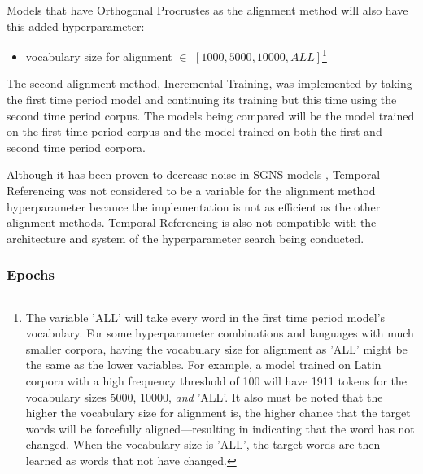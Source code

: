 Models that have Orthogonal Procrustes as the alignment method will also have this added hyperparameter:
\begin{itemize}
    \item vocabulary size for alignment $\in$ $[1000, 5000, 10000, ALL]$\footnote{The variable 'ALL' will take every word in the first time period model's vocabulary. For some hyperparameter combinations and languages with much smaller corpora, having the vocabulary size for alignment as 'ALL' might be the same as the lower variables. For example, a model trained on Latin corpora with a high frequency threshold of 100 will have 1911 tokens for the vocabulary sizes 5000, 10000, \emph{and} 'ALL'. It also must be noted that the higher the vocabulary size for alignment is, the higher chance that the target words will be forcefully aligned—resulting in indicating that the word has not changed. When the vocabulary size is 'ALL', the target words are then learned as words that not have changed.} 
\end{itemize}%


The second alignment method,  Incremental Training, was implemented by taking the first time period model and continuing its training but this time using the second time period corpus. The models being compared will be the model trained on the first time period corpus and the model trained on both the first and second time period corpora.

Although it has been proven to decrease noise in SGNS models \citep{dubossarsky-etal-2019-time}, Temporal Referencing was not considered to be a variable for the alignment method hyperparameter becauce the implementation is not as efficient as the other alignment methods. Temporal Referencing is also not compatible with the architecture and system of the hyperparameter search being conducted. 


\subsubsection{Epochs} 
\label{exp-epochs}

